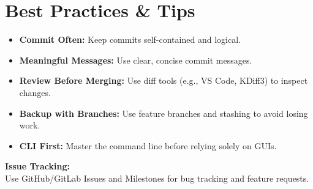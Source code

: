 \documentclass[a4paper,10pt]{article}
\begin{document}
\section{Best Practices \& Tips}
\begin{itemize}
  \item \textbf{Commit Often:} Keep commits self-contained and logical.
  \item \textbf{Meaningful Messages:} Use clear, concise commit messages.
  \item \textbf{Review Before Merging:} Use diff tools (e.g., VS Code, KDiff3) to inspect changes.
  \item \textbf{Backup with Branches:} Use feature branches and stashing to avoid losing work.
  \item \textbf{CLI First:} Master the command line before relying solely on GUIs.
\end{itemize}

\textbf{Issue Tracking:} \\
Use GitHub/GitLab Issues and Milestones for bug tracking and feature requests.
\end{document}
